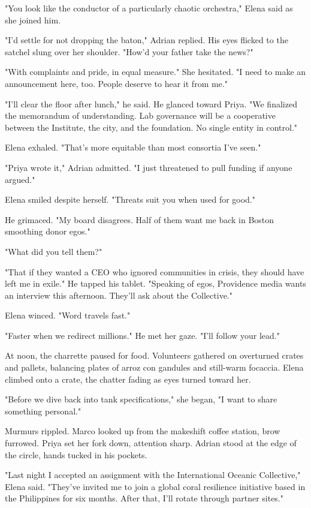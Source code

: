 "You look like the conductor of a particularly chaotic orchestra," Elena said as she joined him.

"I'd settle for not dropping the baton," Adrian replied. His eyes flicked to the satchel slung over her shoulder. "How'd your father take the news?"

"With complaints and pride, in equal measure." She hesitated. "I need to make an announcement here, too. People deserve to hear it from me."

"I'll clear the floor after lunch," he said. He glanced toward Priya. "We finalized the memorandum of understanding. Lab governance will be a cooperative between the Institute, the city, and the foundation. No single entity in control."

Elena exhaled. "That's more equitable than most consortia I've seen."

"Priya wrote it," Adrian admitted. "I just threatened to pull funding if anyone argued."

Elena smiled despite herself. "Threats suit you when used for good."

He grimaced. "My board disagrees. Half of them want me back in Boston smoothing donor egos."

"What did you tell them?"

"That if they wanted a CEO who ignored communities in crisis, they should have left me in exile." He tapped his tablet. "Speaking of egos, Providence media wants an interview this afternoon. They'll ask about the Collective."

Elena winced. "Word travels fast."

"Faster when we redirect millions." He met her gaze. "I'll follow your lead."

At noon, the charrette paused for food. Volunteers gathered on overturned crates and pallets, balancing plates of arroz con gandules and still-warm focaccia. Elena climbed onto a crate, the chatter fading as eyes turned toward her.

"Before we dive back into tank specifications," she began, "I want to share something personal."

Murmurs rippled. Marco looked up from the makeshift coffee station, brow furrowed. Priya set her fork down, attention sharp. Adrian stood at the edge of the circle, hands tucked in his pockets.

"Last night I accepted an assignment with the International Oceanic Collective," Elena said. "They've invited me to join a global coral resilience initiative based in the Philippines for six months. After that, I'll rotate through partner sites."

